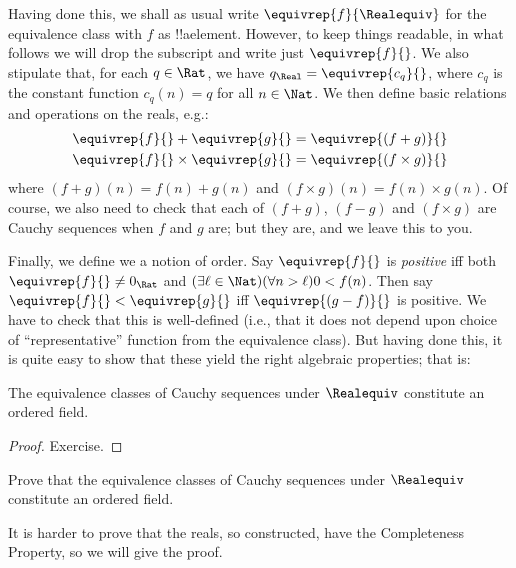 \documentclass[../../../include/open-logic-section]{subfiles}
\begin{document}
Having done this, we shall as usual write $\equivrep{f}{\Realequiv}$
for the equivalence class with $f$ as !!a{element}. However, to keep
things readable, in what follows we will drop the subscript and write
just $\equivrep{f}{}$. We also stipulate that, for each $q \in \Rat$,
we have $q_{\Real} = \equivrep{c_{q}}{}$, where $c_{q}$ is the
constant function $c_q(n) = q$ for all $n \in \Nat$. We then define
basic relations and operations on the reals, e.g.:
\begin{align*}
	\equivrep{f}{} + \equivrep{g}{} &= 	\equivrep{(f + g)}{} \\
	\equivrep{f}{} \times 	\equivrep{g}{} &= \equivrep{(f \times g)}{} 
\end{align*}
where $(f + g)(n) = f(n) + g(n)$ and $(f \times g)(n) = f(n) \times
g(n)$. Of course, we also need to check that each of  $(f + g)$,
$(f-g)$ and $(f\times g)$ are Cauchy sequences when $f$ and $g$ are;
but they are, and we leave this to you.

Finally, we define we a notion of order. Say $\equivrep{f}{}$ is
\emph{positive} iff both $\equivrep{f}{}\neq 0_\Rat$ and $(\exists
\ell \in \Nat)(\forall n > \ell)0 < f(n)$. Then say $\equivrep{f}{} <
\equivrep{g}{}$ iff $\equivrep{(g - f)}{}$ is positive. We have to
check that this is well-defined (i.e., that it does not depend upon
choice of ``representative'' function from the equivalence class). 
But having done this, it is quite easy to show that these yield the
right algebraic properties; that is:
\begin{thm}
The equivalence classes of Cauchy sequences under $\Realequiv$ constitute an ordered field.
\end{thm}

\begin{proof}
Exercise. 
\end{proof}

\begin{prob}
Prove that the equivalence classes of Cauchy sequences under $\Realequiv$ constitute an ordered field.
\end{prob}

It is harder to prove that the reals, so constructed, have the
Completeness Property, so we will give the proof.
\end{document}
